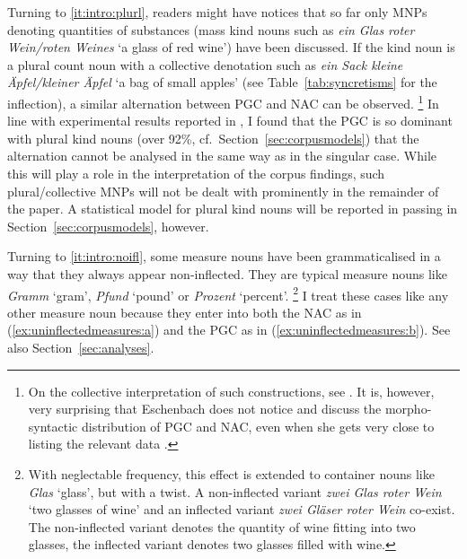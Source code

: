 \documentclass[USenglish]{article}
\begin{document}
Turning to \ref{it:intro:plurl}, readers might have notices that so far only MNPs denoting quantities of substances (mass kind nouns such as \textit{ein Glas roter Wein\slash roten Weines} `a glass of red wine') have been discussed.
If the kind noun is a plural count noun with a collective denotation such as \textit{ein Sack kleine Äpfel\slash kleiner Äpfel} `a bag of small apples' (see Table~\ref{tab:syncretisms} for the inflection), a similar alternation between PGC and NAC can be observed.%
\footnote{\label{fn:eschenbash}On the collective interpretation of such constructions, see \cite{Eschenbach1994}.
It is, however, very surprising that Eschenbach does not notice and discuss the morpho-syntactic distribution of PGC and NAC, even when she gets very close to listing the relevant data \citep[217]{Eschenbach1994}.}
In line with experimental results reported in \cite[15--16]{Zimmer2015}, I found that the PGC is so dominant with plural kind nouns (over 92\%, cf.\ Section~\ref{sec:corpusmodels}) that the alternation cannot be analysed in the same way as in the singular case.
While this will play a role in the interpretation of the corpus findings, such plural\slash collective MNPs will not be dealt with prominently in the remainder of the paper.
A statistical model for plural kind nouns will be reported in passing in Section~\ref{sec:corpusmodels}, however.

Turning to \ref{it:intro:noifl}, some measure nouns have been grammaticalised in a way that they always appear non-inflected.
They are typical measure nouns like \textit{Gramm} `gram', \textit{Pfund} `pound' or \textit{Prozent} `percent'.%
\footnote{With neglectable frequency, this effect is extended to container nouns like \textit{Glas} `glass', but with a twist.
A non-inflected variant \textit{zwei Glas roter Wein} `two glasses of wine' and an inflected variant \textit{zwei Gläser roter Wein} co-exist.
The non-inflected variant denotes the quantity of wine fitting into two glasses, the inflected variant denotes two glasses filled with wine.}
I treat these cases like any other measure noun because they enter into both the NAC as in (\ref{ex:uninflectedmeasures:a}) and the PGC as in (\ref{ex:uninflectedmeasures:b}).
See also Section~\ref{sec:analyses}.

\begin{exe}
  \ex\label{ex:uninflectedmeasures}
  \begin{xlist}
  \end{xlist}
\end{exe}
\end{document}
